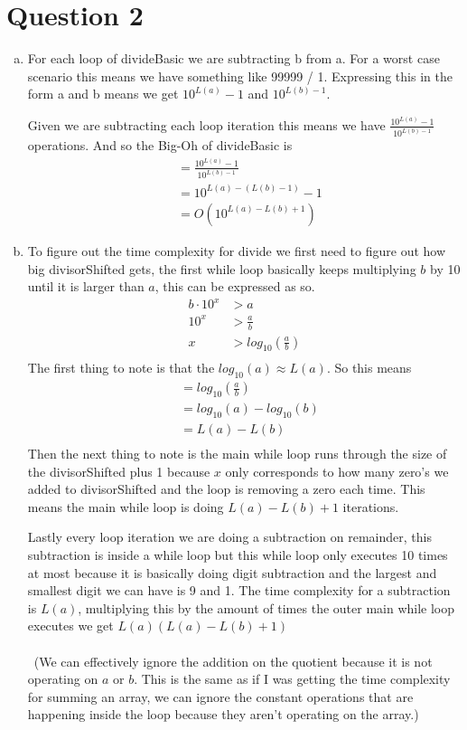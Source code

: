 \documentclass[journal,a4paper]{article}
\begin{document}
\section*{Question 2}
\begin{enumerate}[(a)]
	\item For each loop of divideBasic we are subtracting b from a. For a worst case scenario this means we have something like 99999 / 1. Expressing this in the form a and b means we get $10^{L(a)}-1$ and $10^{L(b)-1}$. 

Given we are subtracting each loop iteration this means we have $\frac{10^{L(a)}-1}{10^{L(b)-1}}$ operations. And so the Big-Oh of divideBasic is 
	\begin{align*}
		&= \frac{10^{L(a)}-1}{10^{L(b)-1}} \\
		&= 10^{L(a)-(L(b)-1)} - 1 \\
		&= O(10^{L(a)-L(b)+1})
	\end{align*}
	\item To figure out the time complexity for divide we first need to figure out how big divisorShifted gets, the first while loop basically keeps multiplying $b$ by 10 until it is larger than $a$, this can be expressed as so.
	\begin{align*}
		b\cdot 10^x &> a \\
		10^x &> \frac{a}{b} \\
		x &> log_{10}(\frac{a}{b}) \\
	\end{align*}
	The first thing to note is that the $log_{10}(a) \approx L(a)$. So this means
	\begin{align*}
		&= log_{10}(\frac{a}{b}) \\
		&= log_{10}(a)-log_{10}(b) \\
		&= L(a) - L(b) \\
	\end{align*}
	Then the next thing to note is the main while loop runs through the size of the divisorShifted plus 1 because $x$ only corresponds to how many zero's we added to divisorShifted and the loop is removing a zero each time. This means the main while loop is doing $L(a)-L(b)+1$ iterations.
	
	Lastly every loop iteration we are doing a subtraction on remainder, this subtraction is inside a while loop but this while loop only executes 10 times at most because it is basically doing digit subtraction and the largest and smallest digit we can have is 9 and 1. The time complexity for a subtraction is $L(a)$, multiplying this by the amount of times the outer main while loop executes we get $L(a)(L(a)-L(b)+1)$
\\\\\
	(We can effectively ignore the addition on the quotient because it is not operating on $a$ or $b$. This is the same as if I was getting the time complexity for summing an array, we can ignore the constant operations that are happening inside the loop because they aren't operating on the array.)
	

\end{enumerate}
\end{document}
